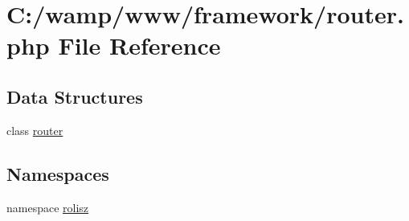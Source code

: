 \hypertarget{router_8php}{
\section{C:/wamp/www/framework/router.php File Reference}
\label{router_8php}
}
\subsection*{Data Structures}
\begin{DoxyCompactItemize}
\item 
class \hyperlink{classrouter}{router}
\end{DoxyCompactItemize}
\subsection*{Namespaces}
\begin{DoxyCompactItemize}
\item 
namespace \hyperlink{namespacerolisz}{rolisz}
\end{DoxyCompactItemize}
